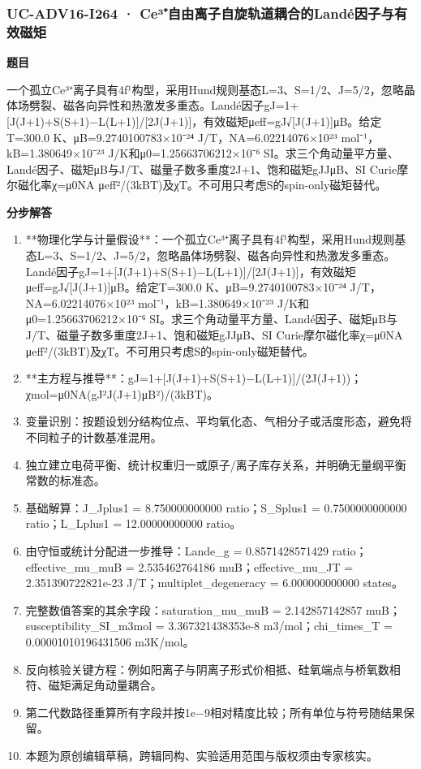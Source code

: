 \documentclass[UTF8,11pt,a4paper]{ctexart}
\begin{document}
\subsubsection*{UC-ADV16-I264 · Ce³⁺自由离子自旋轨道耦合的Landé因子与有效磁矩}
\noindent\textbf{题目}\par
一个孤立Ce³⁺离子具有4f¹构型，采用Hund规则基态L=3、S=1/2、J=5/2，忽略晶体场劈裂、磁各向异性和热激发多重态。Landé因子gJ=1+[J(J+1)+S(S+1)−L(L+1)]/[2J(J+1)]，有效磁矩μeff=gJ√[J(J+1)]μB。给定T=300.0 K、μB=9.2740100783×10⁻²⁴ J/T，NA=6.02214076×10²³ mol⁻¹，kB=1.380649×10⁻²³ J/K和μ0=1.25663706212×10⁻⁶ SI。求三个角动量平方量、Landé因子、磁矩μB与J/T、磁量子数多重度2J+1、饱和磁矩gJJμB、SI Curie摩尔磁化率χ=μ0NA μeff²/(3kBT)及χT。不可用只考虑S的spin-only磁矩替代。\par
\medskip\noindent\textbf{分步解答}
\begin{enumerate}
\item **物理化学与计量假设**：一个孤立Ce³⁺离子具有4f¹构型，采用Hund规则基态L=3、S=1/2、J=5/2，忽略晶体场劈裂、磁各向异性和热激发多重态。Landé因子gJ=1+[J(J+1)+S(S+1)−L(L+1)]/[2J(J+1)]，有效磁矩μeff=gJ√[J(J+1)]μB。给定T=300.0 K、μB=9.2740100783×10⁻²⁴ J/T，NA=6.02214076×10²³ mol⁻¹，kB=1.380649×10⁻²³ J/K和μ0=1.25663706212×10⁻⁶ SI。求三个角动量平方量、Landé因子、磁矩μB与J/T、磁量子数多重度2J+1、饱和磁矩gJJμB、SI Curie摩尔磁化率χ=μ0NA μeff²/(3kBT)及χT。不可用只考虑S的spin-only磁矩替代。
\item **主方程与推导**：gJ=1+[J(J+1)+S(S+1)−L(L+1)]/(2J(J+1))；χmol=μ0NA(gJ²J(J+1)μB²)/(3kBT)。
\item 变量识别：按题设划分结构位点、平均氧化态、气相分子或活度形态，避免将不同粒子的计数基准混用。
\item 独立建立电荷平衡、统计权重归一或原子/离子库存关系，并明确无量纲平衡常数的标准态。
\item 基础解算：J\_Jplus1 = 8.750000000000 ratio；S\_Splus1 = 0.7500000000000 ratio；L\_Lplus1 = 12.00000000000 ratio。
\item 由守恒或统计分配进一步推导：Lande\_g = 0.8571428571429 ratio；effective\_mu\_muB = 2.535462764186 muB；effective\_mu\_JT = 2.351390722821e-23 J/T；multiplet\_degeneracy = 6.000000000000 states。
\item 完整数值答案的其余字段：saturation\_mu\_muB = 2.142857142857 muB；susceptibility\_SI\_m3mol = 3.367321438353e-8 m3/mol；chi\_times\_T = 0.00001010196431506 m3K/mol。
\item 反向核验关键方程：例如阳离子与阴离子形式价相抵、硅氧端点与桥氧数相符、磁矩满足角动量耦合。
\item 第二代数路径重算所有字段并按1e−9相对精度比较；所有单位与符号随结果保留。
\item 本题为原创编辑草稿，跨辑同构、实验适用范围与版权须由专家核实。
\end{enumerate}
\end{document}
